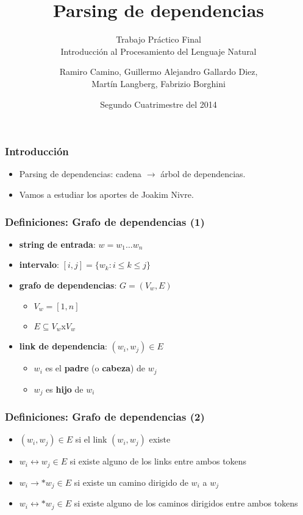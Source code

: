 \documentclass[spanish]{beamer}
\title{Parsing de dependencias}
\subtitle{Trabajo Práctico Final\\Introducción al Procesamiento del Lenguaje Natural}
\author{Ramiro Camino, Guillermo Alejandro Gallardo Diez,\\Martín Langberg, Fabrizio Borghini}
\institute{Universidad de Buenos Aires}
\date{Segundo Cuatrimestre del 2014}
\begin{document}
\frame{\titlepage}

\begin{frame}
\frametitle{Introducción}
\begin{itemize}
\item Parsing de dependencias: cadena $\rightarrow$ árbol de dependencias.
\item Vamos a estudiar los aportes de Joakim Nivre.
\end{itemize}
\end{frame}

\begin{frame}
\frametitle{Definiciones: Grafo de dependencias (1)}
\begin{itemize}
    \item \textbf{string de entrada}: $w = w_1\dots w_n$
    \item \textbf{intervalo}: $[i,j] = \{w_k : i\leq  k\leq  j\}$
    \item \textbf{grafo de dependencias}: $G = (V_w, E)$
    \begin{itemize}
        \item $V_w = [1,n]$
        \item $E\subseteq V_w$x$V_w$
    \end{itemize}
    \item \textbf{link de dependencia}: $(w_i,w_j)\in E$
    \begin{itemize}
        \item $w_i$ es el \textbf{padre} (o \textbf{cabeza}) de $w_j$
        \item $w_j$ es \textbf{hijo} de $w_i$
    \end{itemize}
\end{itemize}
\end{frame}

\begin{frame}
\frametitle{Definiciones: Grafo de dependencias (2)}
\begin{itemize}
    \item $(w_i,w_j)\in E$ si el link $(w_i,w_j)$ existe
    \item $w_i\leftrightarrow  w_j\in E$ si existe alguno de los links entre ambos tokens
    \item $w_i\rightarrow * w_j\in E$ si existe un camino dirigido de $w_i$ a $w_j$
    \item $w_i\leftrightarrow * w_j\in E$ si existe alguno de los caminos dirigidos entre ambos tokens
\end{itemize}
\end{frame}
\end{document}
